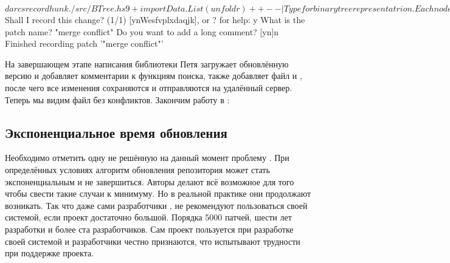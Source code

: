 \begin{code}
$ darcs record
hunk ./src/BTree.hs 9
+import Data.List(unfoldr)
+
+-- | Type for binary tree representatrion. Each node
+-- contains value of type @a@. $
Shall I record this change? (1/1)  [ynWesfvplxdaqjk], or ? for help: y
What is the patch name? "merge conflict"
Do you want to add a long comment? [yn]n
Finished recording patch '"merge conflict"'
\end{code}

На завершающем этапе написания библиотеки Петя 
загружает обновлённую версию и добавляет комментарии
к функциям поиска, также добавляет файл 
и , после чего все изменения сохраняются и 
отправляются на удалённый сервер. Теперь мы видим файл без конфликтов. 
Закончим работу в :


\subsection{Экспоненциальное время обновления}

Необходимо отметить одну не решённую на данный момент 
проблему . При определённых условиях алгоритм 
обновления репозитория  может стать 
экспоненциальным и не завершиться. Авторы делают всё
возможное для того чтобы свести такие случаи к минимуму.
Но в реальной практике они продолжают возникать. 
Так что даже сами разработчики , не рекомендуют 
пользоваться своей системой, если проект достаточно большой. 
Порядка 5000 патчей, шести лет разработки и более ста 
разработчиков. Сам проект  пользуется при
разработке своей системой и разработчики честно 
признаются, что испытывают трудности при поддержке
проекта.


